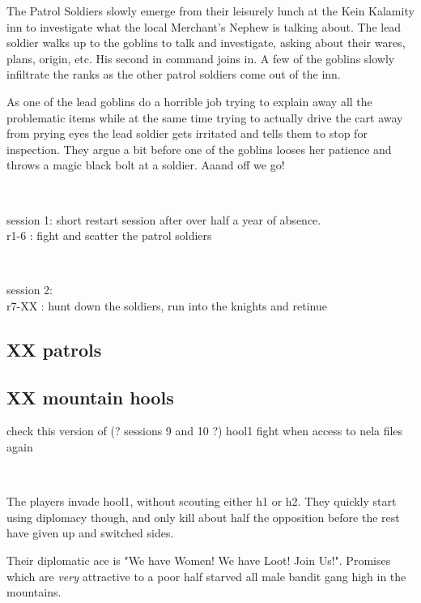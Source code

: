 The Patrol Soldiers slowly emerge from their leisurely lunch at the Kein Kalamity inn to investigate what the local Merchant's Nephew is talking about. The lead soldier walks up to the goblins to talk and investigate, asking about their wares, plans, origin, etc. His second in command joins in. A few of the goblins slowly infiltrate the ranks as the other patrol soldiers come out of the inn.

As one of the lead goblins do a horrible job trying to explain away all the problematic items while at the same time trying to actually drive the cart away from prying eyes the lead soldier gets irritated and tells them to stop for inspection. They argue a bit before one of the goblins looses her patience and throws a magic black bolt at a soldier. Aaand off we go!

\

session 1: short restart session after over half a year of absence.\\
r1-6 : fight and scatter the patrol soldiers

\

session 2:\\
r7-XX : hunt down the soldiers, run into the knights and retinue







% 


\subsection*{XX patrols}




\subsection*{XX mountain hools}

\todo check this version of (? sessions 9 and 10 ?) hool1 fight when access to nela files again

\

The players invade hool1, without scouting either h1 or h2. They quickly start using diplomacy though, and only kill about half the opposition before the rest have given up and switched sides.

Their diplomatic ace is "We have Women! We have Loot! Join Us!". Promises which are \emph{very} attractive to a poor half starved all male bandit gang high in the mountains.

